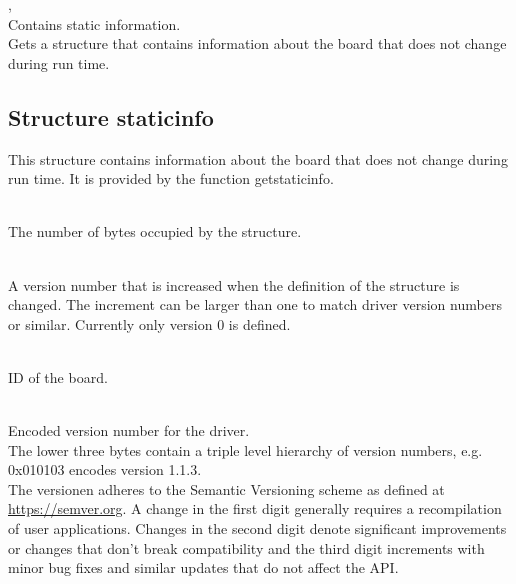     \deviceindex, \lb{}\\
    Contains static information.\\
    Gets a structure that contains information about the board that does not change during run time.\par



\subsection{Structure \prefix static\tu info}

This structure contains information about the board that does not change during run time. It is provided by the function \textsf{\prefix get\tu static\tu info}.\par

\\
The number of bytes occupied by the structure.

\\
A version number that is increased when the definition of the structure is changed. The increment can be larger than one to match driver version numbers or similar. Currently only version 0 is defined.\par

\\
ID of the board.\\

\\
Encoded version number for the driver.\\
The lower three bytes contain a triple level hierarchy of version numbers, e.g. 0x010103 encodes version 1.1.3.\\
The versionen adheres to the Semantic Versioning scheme as defined at \href{https://semver.org}{https://semver.org}. A change in the first digit generally requires a recompilation of user applications. 
Changes in the second digit denote significant improvements or changes that don't break compatibility 
and the third digit increments with minor bug fixes and similar updates that do not affect the API.\par

